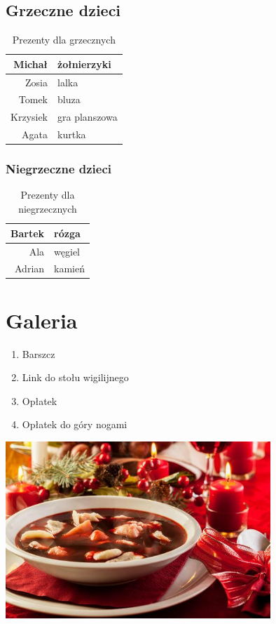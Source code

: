 \documentclass[11pt]{book}
\begin{document}
\section{Grzeczne dzieci}
\begin{table}[h]
\caption{Prezenty dla grzecznych}
\label{Grzeczni}
\begin{center}
\begin{tabular}{|r|l|}
  \hline
  Michał & żołnierzyki \\
  \hline
  Zosia & lalka \\
  \hline
  Tomek & bluza \\
  \hline
  Krzysiek & gra planszowa \\
  \hline
  Agata & kurtka \\
  \hline
\end{tabular} 
\end{center}
\end{table}

\subsection{Niegrzeczne dzieci}
\begin{table}[h]
\caption{Prezenty dla niegrzecznych}
\label{Nierzeczni}
\begin{center}
\begin{tabular}{|r|l|}
  \hline
  Bartek & rózga \\
  \hline
  Ala & węgiel \\
  \hline
  Adrian & kamień \\
  \hline
\end{tabular} 
\end{center}
\end{table}

\chapter{Galeria}

\begin{enumerate}
	\item Barszcz
	\item Link do stołu wigilijnego
	\item Opłatek
	\item Opłatek do góry nogami
\end{enumerate}

\includegraphics[width=100mm,height=!]{barszcz.jpeg}
\end{document}
